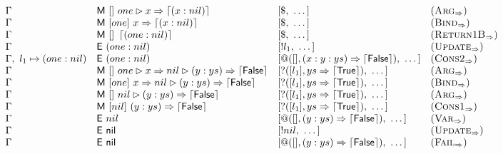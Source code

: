 \begin{figure*}
\[\begin{array}{llll}
            \Gamma      & \textsf{M}~[]~one\rhd x \Rightarrow \left\lceil (x : nil)\right\rceil      & [\$,~\dots]                                       & (\textsc{Arg}_{\Rightarrow})      \\
            \Gamma      & \textsf{M}~[one]~x \Rightarrow \left\lceil (x : nil)\right\rceil                   & [\$,~\dots]                                       & (\textsc{Bind}_{\Rightarrow})     \\
            \Gamma      & \textsf{M}~[]~\left\lceil (one : nil)\right\rceil                     & [\$,~\dots]                                       & (\textsc{Return1B}_{\Rightarrow}) \\
            \Gamma      & \textsf{E}~(one : nil)                                        & [!l_1,~\dots]                                     & (\textsc{Update}_{\Rightarrow})   \\
            \Gamma ,~ l_1\mapsto(one : nil)
                        & \textsf{E}~(one : nil)                                        & [@([],(x : y : ys) \Rightarrow \left\lceil \textsf{False}\right\rceil),~\dots] & (\textsc{Cons2}_{\Rightarrow})    \\
            \Gamma      & \textsf{M}~[]~one\rhd x \Rightarrow nil\rhd (y : ys) \Rightarrow \left\lceil \textsf{False}\right\rceil
                        & [?([l_1],ys \Rightarrow \left\lceil \textsf{True}\right\rceil),~\dots]                 & (\textsc{Arg}_{\Rightarrow})                                                          \\
            \Gamma      & \textsf{M}~[one]~x \Rightarrow nil\rhd (y : ys) \Rightarrow \left\lceil \textsf{False}\right\rceil
                        & [?([l_1],ys \Rightarrow \left\lceil \textsf{True}\right\rceil),~\dots]                 & (\textsc{Bind}_{\Rightarrow})                                                         \\
            \Gamma      & \textsf{M}~[]~nil\rhd (y : ys) \Rightarrow \left\lceil \textsf{False}\right\rceil
                        & [?([l_1],ys \Rightarrow \left\lceil \textsf{True}\right\rceil),~\dots]                 & (\textsc{Arg}_{\Rightarrow})                                                          \\
            \Gamma      & \textsf{M}~[nil]~(y : ys) \Rightarrow \left\lceil \textsf{False}\right\rceil             & [?([l_1],ys \Rightarrow \left\lceil \textsf{True}\right\rceil),~\dots]         & (\textsc{Cons1}_{\Rightarrow})    \\
            \Gamma      & \textsf{E}~nil                                                & [@([],(y : ys) \Rightarrow \left\lceil \textsf{False}\right\rceil),~\dots]     & (\textsc{Var}_{\Rightarrow})      \\
            \Gamma      & \textsf{E}~\textsf{nil}                                       & [!nil,~\dots]                                     & (\textsc{Update}_{\Rightarrow})   \\
            \Gamma      & \textsf{E}~\textsf{nil}                                       & [@([],(y : ys) \Rightarrow \left\lceil \textsf{False}\right\rceil),~\dots]     & (\textsc{Fail}_{\Rightarrow})     \\

\end{array}\]
\end{figure*}
